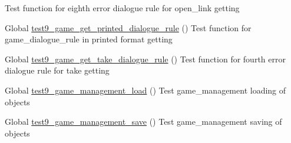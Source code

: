 \begin{DoxyRefList}
%
Test function for eighth error dialogue rule for open\+\_\+link getting  
\item[Global \mbox{\hyperlink{game__test_8c_a7723b36a125ad1647df21ea99a261bdf}{test9\+\_\+game\+\_\+get\+\_\+printed\+\_\+dialogue\+\_\+rule}} ()]\label{test__test000319}%
%
Test function for game\+\_\+dialogue\+\_\+rule in printed format getting  
\item[Global \mbox{\hyperlink{game__test_8c_a001f311bb23f39339fd2fb3f29cad5bd}{test9\+\_\+game\+\_\+get\+\_\+take\+\_\+dialogue\+\_\+rule}} ()]\label{test__test000343}%
%
Test function for fourth error dialogue rule for take getting  
\item[Global \mbox{\hyperlink{game__management__test_8c_a69e0940f5a71dbaa6665fdc7aeb45d72}{test9\+\_\+game\+\_\+management\+\_\+load}} ()]\label{test__test000117}%
%
Test game\+\_\+management loading of objects  
\item[Global \mbox{\hyperlink{game__management__test_8c_ab725415455061a7619e13ab512b58419}{test9\+\_\+game\+\_\+management\+\_\+save}} ()]\label{test__test000131}%
%
Test game\+\_\+management saving of objects 
\end{DoxyRefList}